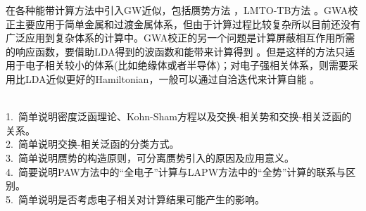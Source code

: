 {在各种能带计算方法中引入GW近似，包括赝势方法%
，LMTO-TB方法%
。GWA校正主要应用于简单金属和过渡金属体系，但由于计算过程比较复杂所以目前还没有广泛应用到复杂体系的计算中。GWA校正的另一个问题是计算屏蔽相互作用所需的响应函数，要借助LDA得到的波函数和能带来计算得到%
。但是这样的方法只适用于电子相关较小的体系(比如绝缘体或者半导体)；对电子强相关体系，则需要采用比LDA近似更好的Hamiltonian，一般可以通过自洽迭代来计算自能%
。

\vskip 5pt
\\
1.~简单说明密度泛函理论、\textrm{Kohn-Sham}方程以及交换-相关势和交换-相关泛函的关系。\\
2.~简单说明交换-相关泛函的分类方式。\\
3.~简单说明赝势的构造原则，可分离赝势引入的原因及应用意义。\\
4.~简要说明\textrm{PAW}方法中的``全电子''计算与\textrm{LAPW}方法中的``全势''计算的联系与区别。\\
5.~简单说明是否考虑电子相关对计算结果可能产生的影响。\\

}
